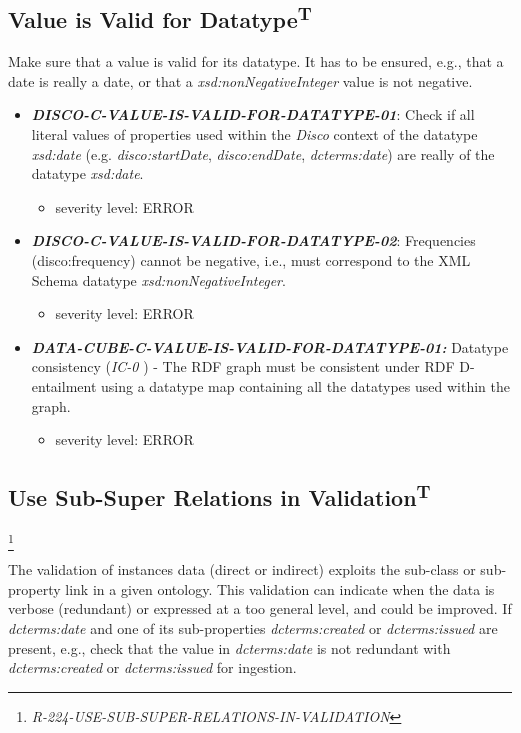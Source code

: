 \documentclass{llncs}
\begin{document}
\subsection{Value is Valid for Datatype\textsuperscript{T}}

Make sure that a value is valid for its datatype.
It has to be ensured, e.g., that a date is really a date, or that a \emph{xsd:nonNegativeInteger} value is not negative. 

\begin{itemize}
	\item \textbf{{\em DISCO-C-VALUE-IS-VALID-FOR-DATATYPE-01}}: 
	Check if all literal values of properties used within the \emph{Disco} context of the datatype {\em xsd:date} (e.g. {\em disco:startDate}, {\em disco:endDate}, {\em dcterms:date}) are really of the datatype {\em xsd:date}.
	\begin{itemize}
		\item severity level: ERROR
	\end{itemize}
	\item \textbf{{\em DISCO-C-VALUE-IS-VALID-FOR-DATATYPE-02}}: 
	Frequencies (disco:frequency) cannot be negative, i.e., must correspond  to the XML Schema datatype \emph{xsd:nonNegativeInteger}.
	\begin{itemize}
		\item severity level: ERROR
	\end{itemize}
\end{itemize}

\begin{itemize}
	\item \textbf{{\em DATA-CUBE-C-VALUE-IS-VALID-FOR-DATATYPE-01:}}
	Datatype consistency (\emph{IC-0} \cite{CyganiakReynolds2014}) -  
	The RDF graph must be consistent under RDF D-entailment using a datatype map containing all the datatypes used within the graph. 
	\begin{itemize}
		\item severity level: ERROR
	\end{itemize}
\end{itemize}

\subsection{Use Sub-Super Relations in Validation\textsuperscript{T}}

\footnote{\emph{R-224-USE-SUB-SUPER-RELATIONS-IN-VALIDATION}}

The validation of instances data (direct or indirect) exploits the sub-class or sub-property link in a given ontology.
This validation can indicate when the data is verbose (redundant) or expressed at a too general level, and could be improved.
If \emph{dcterms:date} and one of its sub-properties \emph{dcterms:created} or \emph{dcterms:issued} are present, e.g., check that the value in \emph{dcterms:date} is not redundant with \emph{dcterms:created} or \emph{dcterms:issued} for ingestion.
\end{document}
